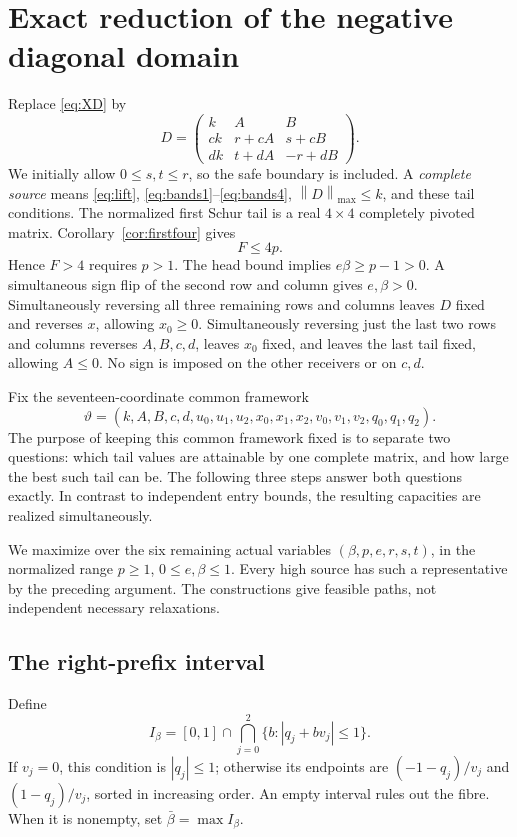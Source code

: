 \documentclass[11pt,reqno]{amsart}
\theoremstyle{definition}
\theoremstyle{remark}
\newcommand{\mx}[1]{\left\|#1\right\|_{\max}}
\begin{document}
\section{Exact reduction of the negative diagonal domain}\label{sec:fibre}

Replace \eqref{eq:XD} by
\begin{equation}\label{eq:BD}
D=
\begin{pmatrix}
k&A&B\\
ck&r+cA&s+cB\\
dk&t+dA&-r+dB
\end{pmatrix}.
\end{equation}
We initially allow \(0\le s,t\le r\), so the safe boundary is included.
A \emph{complete source} means \eqref{eq:lift},
\eqref{eq:bands1}--\eqref{eq:bands4}, \(\mx D\le k\), and these tail
conditions.
The normalized first Schur tail is a real \(4\times4\) completely
pivoted matrix. Corollary~\ref{cor:firstfour} gives
\begin{equation}\label{eq:F4p}
F\le4p.
\end{equation}
Hence \(F>4\) requires \(p>1\). The head bound implies
\(e\beta\ge p-1>0\). A simultaneous sign flip of the second row and
column gives \(e,\beta>0\). Simultaneously reversing all three remaining
rows and columns leaves \(D\) fixed and reverses \(x\), allowing
\(x_0\ge0\). Simultaneously reversing just the last two rows and
columns reverses \(A,B,c,d\), leaves \(x_0\) fixed, and leaves the
last tail fixed, allowing \(A\le0\).
No sign is imposed on the other
receivers or on \(c,d\).

Fix the seventeen-coordinate common framework
\begin{equation}\label{eq:frame}
\vartheta=(k,A,B,c,d,u_0,u_1,u_2,x_0,x_1,x_2,
v_0,v_1,v_2,q_0,q_1,q_2).
\end{equation}
The purpose of keeping this common framework fixed is to separate two
questions: which tail values are attainable by one complete matrix, and
how large the best such tail can be. The following three steps answer
both questions exactly. In contrast to independent entry bounds, the
resulting capacities are realized simultaneously.

We maximize over the six remaining actual variables
\((\beta,p,e,r,s,t)\), in the normalized range
\(p\ge1\), \(0\le e,\beta\le1\). Every high source has such a
representative by the preceding argument.
The constructions give feasible paths, not
independent necessary relaxations.

\subsection{The right-prefix interval}
Define
\[
I_\beta=[0,1]\cap\bigcap_{j=0}^2\{b:|q_j+bv_j|\le1\}.
\]
If \(v_j=0\), this condition is \(|q_j|\le1\); otherwise its endpoints
are \((-1-q_j)/v_j\) and \((1-q_j)/v_j\), sorted in increasing order.
An empty interval rules out the fibre. When it is nonempty, set
\(\bar\beta=\max I_\beta\).
\end{document}
